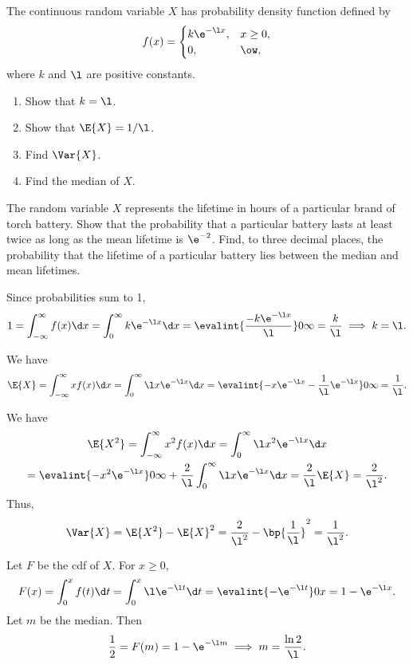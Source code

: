 \begin{problem}
    The continuous random variable $X$ has probability density function defined by \[f(x) = \begin{cases}
        k \e^{-\l x}, & x \geq 0,\\
        0, & \ow,
    \end{cases}\] where $k$ and $\l$ are positive constants.

    \begin{enumerate}
        \item Show that $k = \l$.
        \item Show that $\E{X} = 1/\l$.
        \item Find $\Var{X}$.
        \item Find the median of $X$.
    \end{enumerate}

    The random variable $X$ represents the lifetime in hours of a particular brand of torch battery. Show that the probability that a particular battery lasts at least twice as long as the mean lifetime is $\e^{-2}$. Find, to three decimal places, the probability that the lifetime of a particular battery lies between the median and mean lifetimes.
\end{problem}
\begin{solution}
    \begin{ppart}
        Since probabilities sum to 1, \[1 = \int_{-\infty}^\infty f(x) \d x = \int_0^\infty k\e^{-\l x} \d x = \evalint{\frac{-k\e^{-\l x}}{\l}}0\infty = \frac{k}{\l} \implies k = \l.\]
    \end{ppart}
    \begin{ppart}
        We have \[\E{X} = \int_{-\infty}^\infty x f(x) \d x = \int_0^\infty \l x \e^{-\l x} \d x = \evalint{-x\e^{-\l x} - \frac1\l \e^{-\l x}}0\infty = \frac1\l.\]
    \end{ppart}
    \begin{ppart}
        We have
        \begin{gather*}
            \E{X^2} = \int_{-\infty}^\infty x^2 f(x) \d x = \int_0^\infty \l x^2 \e^{-\l x} \d x\\
            = \evalint{-x^2 \e^{-\l x}}0\infty + \frac2{\l} \int_0^\infty \l x \e^{-\l x} \d x= \frac2\l \E{X} = \frac2{\l^2}.
        \end{gather*}
        Thus, \[\Var{X} = \E{X^2} - \E{X}^2 = \frac2{\l^2} - \bp{\frac1\l}^2 = \frac1{\l^2}.\]
    \end{ppart}
    \begin{ppart}
        Let $F$ be the cdf of $X$. For $x \geq 0$, \[F(x) = \int_0^x f(t) \d t = \int_0^x \l \e^{-\l t} \d t = \evalint{-\e^{-\l t}}0x = 1 - \e^{-\l x}.\] Let $m$ be the median. Then \[\frac12 = F(m) = 1 - \e^{-\l m} \implies m = \frac{\ln 2}{\l}.\]
    \end{ppart}
\end{solution}

